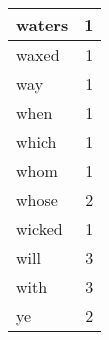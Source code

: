 \begin{center}
\begin{longtable}{l|r}
waters & 1 \\ \hline
waxed & 1 \\ \hline
way & 1 \\ \hline
when & 1 \\ \hline
which & 1 \\ \hline
whom & 1 \\ \hline
whose & 2 \\ \hline
wicked & 1 \\ \hline
will & 3 \\ \hline
with & 3 \\ \hline
ye & 2 \\ \hline
\end{longtable}
\end{center}



\normalsize



